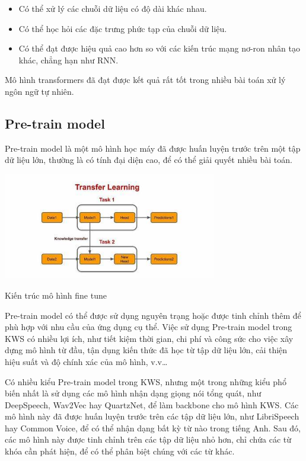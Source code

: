 \begin{itemize}
    \item Có thể xử lý các chuỗi dữ liệu có độ dài khác nhau.
    \item Có thể học hỏi các đặc trưng phức tạp của chuỗi dữ liệu.
    \item Có thể đạt được hiệu quả cao hơn so với các kiến trúc mạng nơ-ron nhân tạo khác, chẳng hạn như RNN.
\end{itemize}

Mô hình transformers đã đạt được kết quả rất tốt trong nhiều bài toán xử lý ngôn ngữ tự nhiên.\cite{transformer}

\subsection{Pre-train model}

Pre-train model là một mô hình học máy đã được huấn luyện trước trên một tập dữ liệu lớn, thường là có tính đại diện cao, để có thể giải quyết nhiều bài toán.

\begin{minipage}{\linewidth}
    \captionsetup{type=figure}
    \centering
    \includegraphics[width=0.7\textwidth]{images/pre-train-model.png}
    \caption{Kiến trúc mô hình fine tune}
\end{minipage}

Pre-train model có thể được sử dụng nguyên trạng hoặc được tinh chỉnh thêm để phù hợp với nhu cầu của ứng dụng cụ thể. Việc sử dụng Pre-train model trong KWS có nhiều lợi ích, như tiết kiệm thời gian, chi phí và công sức cho việc xây dựng mô hình từ đầu, tận dụng kiến thức đã học từ tập dữ liệu lớn, cải thiện hiệu suất và độ chính xác của mô hình, v.v…

Có nhiều kiểu Pre-train model trong KWS, nhưng một trong những kiểu phổ biến nhất là sử dụng các mô hình nhận dạng giọng nói tổng quát, như DeepSpeech, Wav2Vec hay QuartzNet, để làm backbone cho mô hình KWS. Các mô hình này đã được huấn luyện trước trên các tập dữ liệu lớn, như LibriSpeech hay Common Voice, để có thể nhận dạng bất kỳ từ nào trong tiếng Anh. Sau đó, các mô hình này được tinh chỉnh trên các tập dữ liệu nhỏ hơn, chỉ chứa các từ khóa cần phát hiện, để có thể phân biệt chúng với các từ khác\cite{pre-trained-models}.

